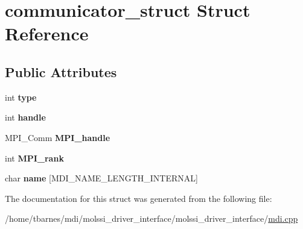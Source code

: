 \hypertarget{structcommunicator__struct}{\section{communicator\-\_\-struct Struct Reference}
\label{structcommunicator__struct}
}
\subsection*{Public Attributes}
\begin{DoxyCompactItemize}
\item 
\hypertarget{structcommunicator__struct_a0c9df913dafd6858581dab0cffd54a89}{int {\bfseries type}}\label{structcommunicator__struct_a0c9df913dafd6858581dab0cffd54a89}

\item 
\hypertarget{structcommunicator__struct_a93b2925f34f7610fd9d97fb6e7a439c9}{int {\bfseries handle}}\label{structcommunicator__struct_a93b2925f34f7610fd9d97fb6e7a439c9}

\item 
\hypertarget{structcommunicator__struct_aa79e48db3b6e63fbb39e6d43e41c752d}{M\-P\-I\-\_\-\-Comm {\bfseries M\-P\-I\-\_\-handle}}\label{structcommunicator__struct_aa79e48db3b6e63fbb39e6d43e41c752d}

\item 
\hypertarget{structcommunicator__struct_ad9e1362c930e8c07d7d9ff2e18cfa9b3}{int {\bfseries M\-P\-I\-\_\-rank}}\label{structcommunicator__struct_ad9e1362c930e8c07d7d9ff2e18cfa9b3}

\item 
\hypertarget{structcommunicator__struct_a8e4a395e54b77f82d50cb0fb1ee96c06}{char {\bfseries name} \mbox{[}M\-D\-I\-\_\-\-N\-A\-M\-E\-\_\-\-L\-E\-N\-G\-T\-H\-\_\-\-I\-N\-T\-E\-R\-N\-A\-L\mbox{]}}\label{structcommunicator__struct_a8e4a395e54b77f82d50cb0fb1ee96c06}

\end{DoxyCompactItemize}


The documentation for this struct was generated from the following file\-:\begin{DoxyCompactItemize}
\item 
/home/tbarnes/mdi/molssi\-\_\-driver\-\_\-interface/molssi\-\_\-driver\-\_\-interface/\hyperlink{mdi_8cpp}{mdi.\-cpp}\end{DoxyCompactItemize}
